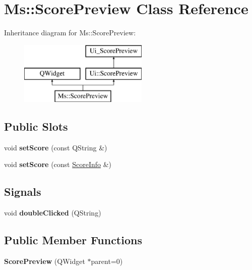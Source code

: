 \hypertarget{class_ms_1_1_score_preview}{}\section{Ms\+:\+:Score\+Preview Class Reference}
\label{class_ms_1_1_score_preview}
Inheritance diagram for Ms\+:\+:Score\+Preview\+:\begin{figure}[H]
\begin{center}
\leavevmode
\includegraphics[height=3.000000cm]{class_ms_1_1_score_preview}
\end{center}
\end{figure}
\subsection*{Public Slots}
\begin{DoxyCompactItemize}
\item 
\mbox{\label{class_ms_1_1_score_preview_abb2e8b5ce2c15359865152d5925bcac9}} 
void {\bfseries set\+Score} (const Q\+String \&)
\item 
\mbox{\label{class_ms_1_1_score_preview_a1943dffb6f5a73b22ea22851f876575c}} 
void {\bfseries set\+Score} (const \hyperlink{class_ms_1_1_score_info}{Score\+Info} \&)
\end{DoxyCompactItemize}
\subsection*{Signals}
\begin{DoxyCompactItemize}
\item 
\mbox{\label{class_ms_1_1_score_preview_a391ae7af9efcb03e154e62bf7e747751}} 
void {\bfseries double\+Clicked} (Q\+String)
\end{DoxyCompactItemize}
\subsection*{Public Member Functions}
\begin{DoxyCompactItemize}
\item 
\mbox{\label{class_ms_1_1_score_preview_a9eabc423fdf347c349523292d1a92b2f}} 
{\bfseries Score\+Preview} (Q\+Widget $\ast$parent=0)
\end{DoxyCompactItemize}
